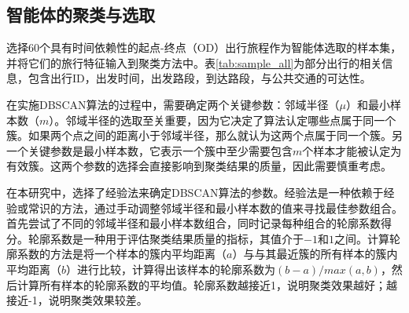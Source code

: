 \subsection{智能体的聚类与选取}


选择60个具有时间依赖性的起点-终点（OD）出行旅程作为智能体选取的样本集，并将它们的旅行特征输入到聚类方法中。表\ref{tab:sample_all}为部分出行的相关信息，包含出行ID，出发时间，出发路段，到达路段，与公共交通的可达性。

\renewcommand{\arraystretch}{1.2}
\begin{table}[htbp]
\centering
\caption{智能体部分样本数据示例}
\label{tab:sample_all}

\begin{adjustbox}{center}
\end{adjustbox}
\end{table}


在实施DBSCAN算法的过程中，需要确定两个关键参数：邻域半径（$\mu$）和最小样本数（$m$）。邻域半径的选取至关重要，因为它决定了算法认定哪些点属于同一个簇。如果两个点之间的距离小于邻域半径，那么就认为这两个点属于同一个簇。另一个关键参数是最小样本数，它表示一个簇中至少需要包含$m$个样本才能被认定为有效簇。这两个参数的选择会直接影响到聚类结果的质量，因此需要慎重考虑。

在本研究中，选择了经验法来确定DBSCAN算法的参数。经验法是一种依赖于经验或常识的方法，通过手动调整邻域半径和最小样本数的值来寻找最佳参数组合。首先尝试了不同的邻域半径和最小样本数组合，同时记录每种组合的轮廓系数得分。轮廓系数是一种用于评估聚类结果质量的指标，其值介于$-1$和$1$之间。计算轮廓系数的方法是将一个样本的簇内平均距离（$a$）与与其最近簇的所有样本的簇内平均距离（$b$）进行比较，计算得出该样本的轮廓系数为${(b-a)} / {max(a,b)}$，然后计算所有样本的轮廓系数的平均值。轮廓系数越接近1，说明聚类效果越好；越接近-1，说明聚类效果较差。

